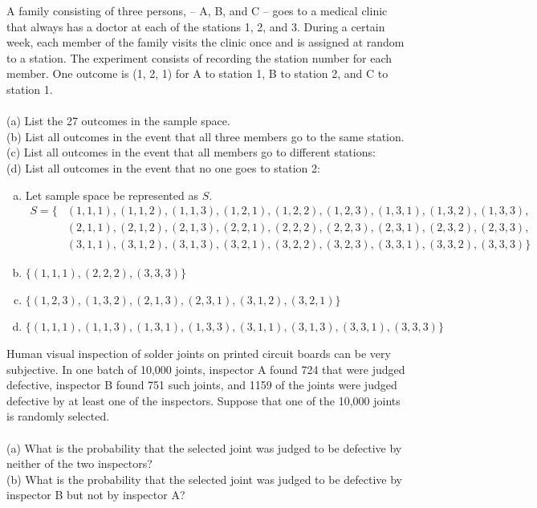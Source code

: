 \documentclass[12pt,letterpaper]{hmcpset}
\begin{document}
\begin{problem}[2.1.5]

A family consisting of three persons, -- A, B, and C -- goes to a medical clinic that always has a doctor at each of the stations 1, 2, and 3. During a certain week, each member of the family visits the clinic once and is assigned at random to a station. The experiment consists of recording the station number for each member. One outcome is (1, 2, 1) for A to station 1, B to station 2, and C to station 1. 
\\ \\
(a) List the 27 outcomes in the sample space.
\\
(b) List all outcomes in the event that all three members go to the same station.
\\
(c) List all outcomes in the event that all members go to different stations:
\\
(d) List all outcomes in the event that no one goes to station 2:



\end{problem}

\begin{solution}
	\begin{enumerate}[(a)]
		\item Let sample space be represented as $S$.
		\begin{align*}
			S = \{&(1, 1, 1), (1, 1, 2), (1, 1, 3), (1, 2, 1), (1, 2, 2), (1, 2, 3), (1, 3, 1), (1, 3, 2), (1, 3, 3), \\
				&(2, 1, 1), (2, 1, 2), (2, 1, 3), (2, 2, 1), (2, 2, 2), (2, 2, 3), (2, 3, 1), (2, 3, 2), (2, 3, 3), \\
				&(3, 1, 1), (3, 1, 2), (3, 1, 3), (3, 2, 1), (3, 2, 2), (3, 2, 3), (3, 3, 1), (3, 3, 2), (3, 3, 3)\}
		\end{align*}
		\item $\{(1,1,1), (2,2,2), (3,3,3)\}$
		\item $\{(1, 2, 3), (1, 3, 2), (2, 1, 3), (2, 3, 1), (3, 1, 2), (3, 2, 1)\}$
		\item $\{(1, 1, 1), (1, 1, 3), (1, 3, 1), (1, 3, 3), (3, 1, 1), (3, 1, 3), (3, 3, 1), (3, 3, 3)\}$
	\end{enumerate}
\end{solution}
\newpage

\begin{problem}[2.2.19]
Human visual inspection of solder joints on printed circuit boards can be very subjective. In one batch of 10,000 joints, inspector A found 724 that were judged defective, inspector B found 751 such joints, and 1159 of the joints were judged defective by at least one of the inspectors. Suppose that one of the 10,000 joints is randomly selected.
\\ \\
(a) What is the probability that the selected joint was judged to be defective by neither of the two inspectors?
\\
(b) What is the probability that the selected joint was judged to be defective by inspector B but not by inspector A?


\end{problem}
\end{document}
